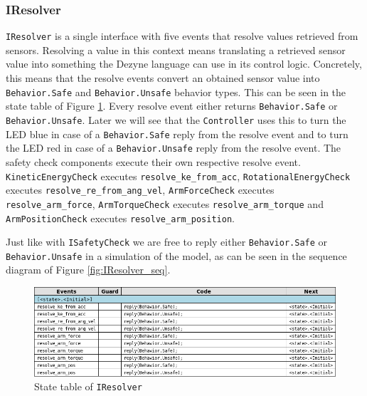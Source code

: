 \documentclass[12pt]{scrreprt}
\begin{document}
\subsubsection{IResolver}
\texttt{IResolver} is a single interface with five events that resolve values retrieved from sensors. Resolving a value in this context means translating a retrieved sensor value into something the Dezyne language can use in its control logic. Concretely, this means that the resolve events convert an obtained sensor value into \texttt{Behavior.Safe} and \texttt{Behavior.Unsafe} behavior types. This can be seen in the state table of Figure \ref{fig:IResolver_state_table}. Every resolve event either returns \texttt{Behavior.Safe} or \texttt{Behavior.Unsafe}. Later we will see that the \texttt{Controller} uses this to turn the LED blue in case of a \texttt{Behavior.Safe} reply from the resolve event and to turn the LED red in case of a \texttt{Behavior.Unsafe} reply from the resolve event. The safety check components execute their own respective resolve event. \texttt{KineticEnergyCheck} executes \texttt{resolve\_ke\_from\_acc}, \texttt{RotationalEnergyCheck} executes \texttt{resolve\_re\_from\_ang\_vel}, \texttt{ArmForceCheck} executes \texttt{resolve\_arm\_force}, \texttt{ArmTorqueCheck} executes \texttt{resolve\_arm\_torque} and \texttt{ArmPositionCheck} executes \texttt{resolve\_arm\_position}.
\par
Just like with \texttt{ISafetyCheck} we are free to reply either \texttt{Behavior.Safe} or \texttt{Behavior.Unsafe} in a simulation of the model, as can be seen in the sequence diagram of Figure \ref{fig:IResolver_seq}.

\begin{figure}[H]
    \centering
    \includegraphics[width=\textwidth]{Figures/results/modelling_figures/IResolver/IResolver_state_table.png}
    \caption{State table of \texttt{IResolver}}
    \label{fig:IResolver_state_table}
\end{figure}
\end{document}
